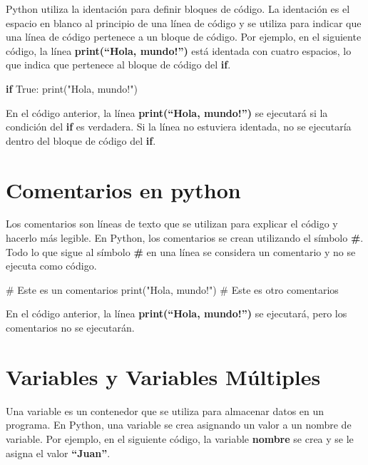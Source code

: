 \documentclass[
  a4paper,
  DIV=11,
  numbers=noendperiod,
  onepage,
  openany]{scrreprt}
\newenvironment{Shaded}{\begin{snugshade}}{\end{snugshade}}
\newcommand{\BuiltInTok}[1]{\textcolor[rgb]{0.00,0.23,0.31}{#1}}
\newcommand{\CommentTok}[1]{\textcolor[rgb]{0.37,0.37,0.37}{#1}}
\newcommand{\ControlFlowTok}[1]{\textcolor[rgb]{0.00,0.23,0.31}{\textbf{#1}}}
\newcommand{\NormalTok}[1]{\textcolor[rgb]{0.00,0.23,0.31}{#1}}
\newcommand{\StringTok}[1]{\textcolor[rgb]{0.13,0.47,0.30}{#1}}
\newcommand{\VariableTok}[1]{\textcolor[rgb]{0.07,0.07,0.07}{#1}}
\begin{document}
Python utiliza la identación para definir bloques de código. La
identación es el espacio en blanco al principio de una línea de código y
se utiliza para indicar que una línea de código pertenece a un bloque de
código. Por ejemplo, en el siguiente código, la línea
\textbf{print(``Hola, mundo!'')} está identada con cuatro espacios, lo
que indica que pertenece al bloque de código del \textbf{if}.

\begin{Shaded}
\begin{Highlighting}[]
\ControlFlowTok{if} \VariableTok{True}\NormalTok{:}
    \BuiltInTok{print}\NormalTok{(}\StringTok{"Hola, mundo!"}\NormalTok{)}
\end{Highlighting}
\end{Shaded}

En el código anterior, la línea \textbf{print(``Hola, mundo!'')} se
ejecutará si la condición del \textbf{if} es verdadera. Si la línea no
estuviera identada, no se ejecutaría dentro del bloque de código del
\textbf{if}.

\section{Comentarios en python}\label{comentarios-en-python}

Los comentarios son líneas de texto que se utilizan para explicar el
código y hacerlo más legible. En Python, los comentarios se crean
utilizando el símbolo \textbf{\#}. Todo lo que sigue al símbolo
\textbf{\#} en una línea se considera un comentario y no se ejecuta como
código.

\begin{Shaded}
\begin{Highlighting}[]
\CommentTok{\# Este es un comentarios}
\BuiltInTok{print}\NormalTok{(}\StringTok{"Hola, mundo!"}\NormalTok{) }\CommentTok{\# Este es otro comentarios}
\end{Highlighting}
\end{Shaded}

En el código anterior, la línea \textbf{print(``Hola, mundo!'')} se
ejecutará, pero los comentarios no se ejecutarán.

\section{Variables y Variables
Múltiples}\label{variables-y-variables-muxfaltiples}

Una variable es un contenedor que se utiliza para almacenar datos en un
programa. En Python, una variable se crea asignando un valor a un nombre
de variable. Por ejemplo, en el siguiente código, la variable
\textbf{nombre} se crea y se le asigna el valor \textbf{``Juan''}.
\end{document}

